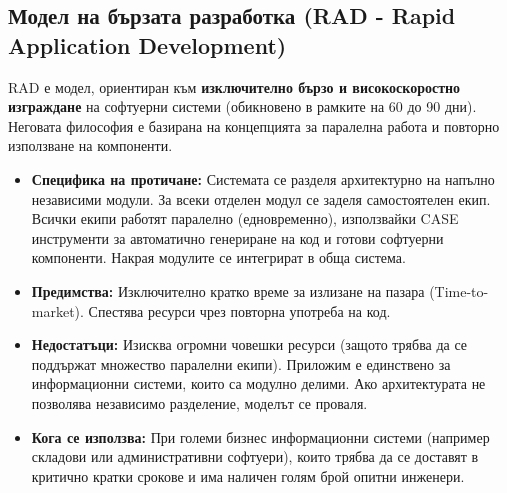 \documentclass{scrartcl}
\begin{document}
\begin{FlushLeft}
\subsection{Модел на бързата разработка (RAD - Rapid Application Development)}
RAD е модел, ориентиран към \textbf{изключително бързо и високоскоростно изграждане} на софтуерни системи (обикновено в рамките на 60 до 90 дни). Неговата философия е базирана на концепцията за паралелна работа и повторно използване на компоненти.
\begin{itemize}
    \item \textbf{Специфика на протичане:} Системата се разделя архитектурно на напълно независими модули. За всеки отделен модул се заделя самостоятелен екип. Всички екипи работят паралелно (едновременно), използвайки CASE инструменти за автоматично генериране на код и готови софтуерни компоненти. Накрая модулите се интегрират в обща система.
    \item \textbf{Предимства:} Изключително кратко време за излизане на пазара (Time-to-market). Спестява ресурси чрез повторна употреба на код.
    \item \textbf{Недостатъци:} Изисква огромни човешки ресурси (защото трябва да се поддържат множество паралелни екипи). Приложим е единствено за информационни системи, които са модулно делими. Ако архитектурата не позволява независимо разделение, моделът се проваля.
    \item \textbf{Кога се използва:} При големи бизнес информационни системи (например складови или административни софтуери), които трябва да се доставят в критично кратки срокове и има наличен голям брой опитни инженери.
\end{itemize}


\end{FlushLeft}
\end{document}

